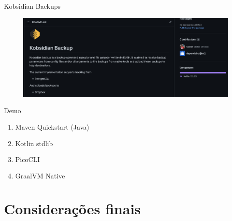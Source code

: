 \documentclass[aspectratio=169]{beamer}
\begin{document}
\begin{frame}{Kobsidian Backups}
	\begin{figure}
		\centering
		\includegraphics[width=\linewidth]{Images/kobsidian.png}
	\end{figure}
\end{frame}


\begin{frame}{Demo}
	\begin{enumerate}
		\item Maven Quickstart (Java)
		\item Kotlin stdlib
        \item PicoCLI
        \item GraalVM Native
	\end{enumerate}
\end{frame}



{
	\section{Considerações finais}
}
\end{document}
